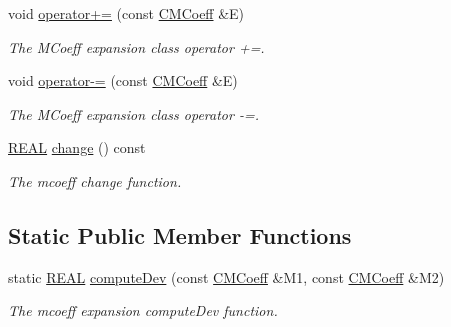 \begin{DoxyCompactItemize}
void \hyperlink{classCMCoeff_ac889bdd0230f6c3f11b8af06915410fe}{operator+=} (const \hyperlink{classCMCoeff}{C\-M\-Coeff} \&E)
\begin{DoxyCompactList}\small\item\em The M\-Coeff expansion class operator +=. \end{DoxyCompactList}\item 
void \hyperlink{classCMCoeff_a28161819e17994b61395e9ddc8532040}{operator-\/=} (const \hyperlink{classCMCoeff}{C\-M\-Coeff} \&E)
\begin{DoxyCompactList}\small\item\em The M\-Coeff expansion class operator -\/=. \end{DoxyCompactList}\item 
\hyperlink{util_8h_a5821460e95a0800cf9f24c38915cbbde}{R\-E\-A\-L} \hyperlink{classCMCoeff_a1bf2b3f4bba7f938a9d9d32855737699}{change} () const 
\begin{DoxyCompactList}\small\item\em The mcoeff change function. \end{DoxyCompactList}\end{DoxyCompactItemize}
\subsection*{Static Public Member Functions}
\begin{DoxyCompactItemize}
\item 
static \hyperlink{util_8h_a5821460e95a0800cf9f24c38915cbbde}{R\-E\-A\-L} \hyperlink{classCMCoeff_af24efe3725c507a1919b043a5335d9ff}{compute\-Dev} (const \hyperlink{classCMCoeff}{C\-M\-Coeff} \&M1, const \hyperlink{classCMCoeff}{C\-M\-Coeff} \&M2)
\begin{DoxyCompactList}\small\item\em The mcoeff expansion compute\-Dev function. \end{DoxyCompactList}\end{DoxyCompactItemize}
